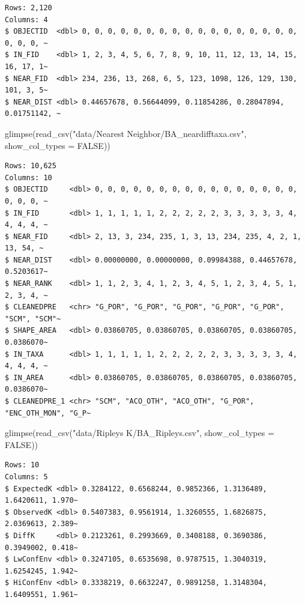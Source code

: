 \documentclass[
  letterpaper,
  DIV=11,
  numbers=noendperiod]{scrartcl}
\newenvironment{Shaded}{\begin{snugshade}}{\end{snugshade}}
\newcommand{\AttributeTok}[1]{\textcolor[rgb]{0.40,0.45,0.13}{#1}}
\newcommand{\ConstantTok}[1]{\textcolor[rgb]{0.56,0.35,0.01}{#1}}
\newcommand{\FunctionTok}[1]{\textcolor[rgb]{0.28,0.35,0.67}{#1}}
\newcommand{\NormalTok}[1]{\textcolor[rgb]{0.00,0.23,0.31}{#1}}
\newcommand{\StringTok}[1]{\textcolor[rgb]{0.13,0.47,0.30}{#1}}
\begin{document}
\begin{verbatim}
Rows: 2,120
Columns: 4
$ OBJECTID  <dbl> 0, 0, 0, 0, 0, 0, 0, 0, 0, 0, 0, 0, 0, 0, 0, 0, 0, 0, 0, 0, ~
$ IN_FID    <dbl> 1, 2, 3, 4, 5, 6, 7, 8, 9, 10, 11, 12, 13, 14, 15, 16, 17, 1~
$ NEAR_FID  <dbl> 234, 236, 13, 268, 6, 5, 123, 1098, 126, 129, 130, 101, 3, 5~
$ NEAR_DIST <dbl> 0.44657678, 0.56644099, 0.11854286, 0.28047894, 0.01751142, ~
\end{verbatim}

\begin{Shaded}
\begin{Highlighting}[]
\FunctionTok{glimpse}\NormalTok{(}\FunctionTok{read\_csv}\NormalTok{(}\StringTok{"data/Nearest Neighbor/BA\_neardifftaxa.csv"}\NormalTok{, }\AttributeTok{show\_col\_types =} \ConstantTok{FALSE}\NormalTok{))}
\end{Highlighting}
\end{Shaded}

\begin{verbatim}
Rows: 10,625
Columns: 10
$ OBJECTID     <dbl> 0, 0, 0, 0, 0, 0, 0, 0, 0, 0, 0, 0, 0, 0, 0, 0, 0, 0, 0, ~
$ IN_FID       <dbl> 1, 1, 1, 1, 1, 2, 2, 2, 2, 2, 3, 3, 3, 3, 3, 4, 4, 4, 4, ~
$ NEAR_FID     <dbl> 2, 13, 3, 234, 235, 1, 3, 13, 234, 235, 4, 2, 1, 13, 54, ~
$ NEAR_DIST    <dbl> 0.00000000, 0.00000000, 0.09984388, 0.44657678, 0.5203617~
$ NEAR_RANK    <dbl> 1, 1, 2, 3, 4, 1, 2, 3, 4, 5, 1, 2, 3, 4, 5, 1, 2, 3, 4, ~
$ CLEANEDPRE   <chr> "G_POR", "G_POR", "G_POR", "G_POR", "G_POR", "SCM", "SCM"~
$ SHAPE_AREA   <dbl> 0.03860705, 0.03860705, 0.03860705, 0.03860705, 0.0386070~
$ IN_TAXA      <dbl> 1, 1, 1, 1, 1, 2, 2, 2, 2, 2, 3, 3, 3, 3, 3, 4, 4, 4, 4, ~
$ IN_AREA      <dbl> 0.03860705, 0.03860705, 0.03860705, 0.03860705, 0.0386070~
$ CLEANEDPRE_1 <chr> "SCM", "ACO_OTH", "ACO_OTH", "G_POR", "ENC_OTH_MON", "G_P~
\end{verbatim}

\begin{Shaded}
\begin{Highlighting}[]
\FunctionTok{glimpse}\NormalTok{(}\FunctionTok{read\_csv}\NormalTok{(}\StringTok{"data/Ripleys K/BA\_Ripley\textquotesingle{}s.csv"}\NormalTok{, }\AttributeTok{show\_col\_types =} \ConstantTok{FALSE}\NormalTok{))}
\end{Highlighting}
\end{Shaded}

\begin{verbatim}
Rows: 10
Columns: 5
$ ExpectedK <dbl> 0.3284122, 0.6568244, 0.9852366, 1.3136489, 1.6420611, 1.970~
$ ObservedK <dbl> 0.5407383, 0.9561914, 1.3260555, 1.6826875, 2.0369613, 2.389~
$ DiffK     <dbl> 0.2123261, 0.2993669, 0.3408188, 0.3690386, 0.3949002, 0.418~
$ LwConfEnv <dbl> 0.3247105, 0.6535698, 0.9787515, 1.3040319, 1.6254245, 1.942~
$ HiConfEnv <dbl> 0.3338219, 0.6632247, 0.9891258, 1.3148304, 1.6409551, 1.961~
\end{verbatim}
\end{document}
